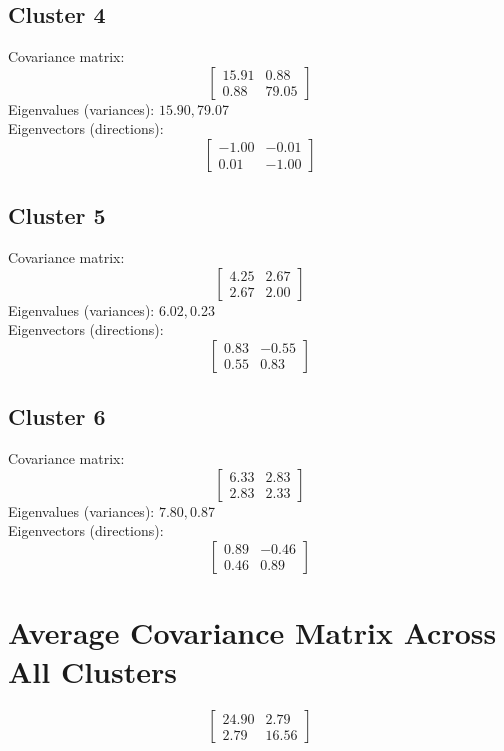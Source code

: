 \documentclass{article}
\begin{document}
\subsection*{Cluster 4}
Covariance matrix:
\[\begin{bmatrix}15.91 & 0.88 \\0.88 & 79.05\end{bmatrix}\]
Eigenvalues (variances): $ 15.90, $79.07\\
Eigenvectors (directions):
\[\begin{bmatrix}-1.00 & -0.01 \\0.01 & -1.00\end{bmatrix}\]
\subsection*{Cluster 5}
Covariance matrix:
\[\begin{bmatrix}4.25 & 2.67 \\2.67 & 2.00\end{bmatrix}\]
Eigenvalues (variances): $ 6.02, $0.23\\
Eigenvectors (directions):
\[\begin{bmatrix}0.83 & -0.55 \\0.55 & 0.83\end{bmatrix}\]
\subsection*{Cluster 6}
Covariance matrix:
\[\begin{bmatrix}6.33 & 2.83 \\2.83 & 2.33\end{bmatrix}\]
Eigenvalues (variances): $ 7.80, $0.87\\
Eigenvectors (directions):
\[\begin{bmatrix}0.89 & -0.46 \\0.46 & 0.89\end{bmatrix}\]
\section*{Average Covariance Matrix Across All Clusters}
\[\begin{bmatrix}24.90 & 2.79 \\2.79 & 16.56\end{bmatrix}\]
\end{document}
